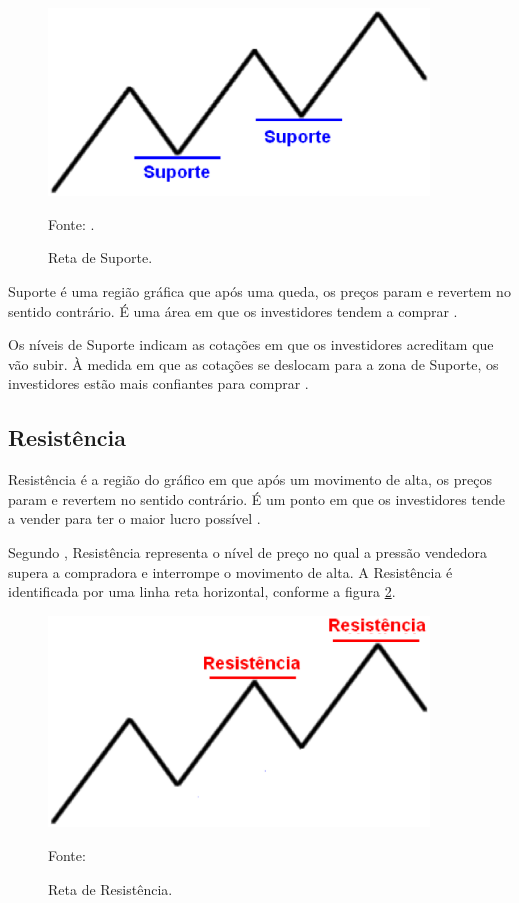 \begin{figure}[htp]
\centering
\includegraphics[width=0.9\textwidth]{figuras/retaSuporte}
\caption{Reta de Suporte.}{Fonte: .}
\label{retaSuporte}
\end{figure}

Suporte é uma região gráfica que após uma queda, os preços param e revertem no sentido contrário. É uma área em que os investidores tendem a comprar \cite[p~97]{debastini2008}.

Os níveis de Suporte indicam as cotações em que os investidores acreditam que vão subir. À medida em que as cotações se deslocam para a zona de Suporte, os investidores estão mais confiantes para comprar \cite{collins2012}.

\subsection{Resistência}

Resistência é a região do gráfico em que após um movimento de alta, os preços param e revertem no sentido contrário. É um ponto em que os investidores tende a vender para ter o maior lucro possível \cite[pág.~98]{debastini2008}.

Segundo , Resistência representa o nível de preço no qual a pressão vendedora supera a compradora e interrompe o movimento de alta. A Resistência é identificada por uma linha reta horizontal, conforme a figura \ref{retaResistencia}.

\begin{figure}[htp]
\centering
\includegraphics[width=0.9\textwidth]{figuras/retaResistencia}
\caption{Reta de Resistência.}{Fonte: } 
\label{retaResistencia}
\end{figure}

